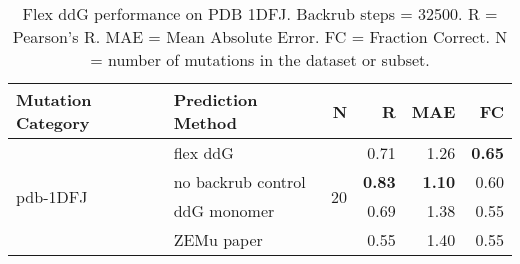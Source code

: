 \begin{table}
  \begin{tabular}{llrrrr}
\toprule
Mutation Category &   Prediction Method &   N &    R &  MAE &   FC \\
\midrule
 \multirow{ 4}{*}{pdb-1DFJ} & flex ddG & \multirow{ 4}{*}{20} & 0.71 & 1.26 & \textbf{0.65}  \\
 & no backrub control & & \textbf{0.83} & \textbf{1.10} & 0.60  \\
 & ddG monomer & & 0.69 & 1.38 & 0.55  \\
 & ZEMu paper & & 0.55 & 1.40 & 0.55  \\
\bottomrule
\end{tabular}
  \caption[Flex ddG performance on PDB 1DFJ]{
    Flex ddG performance on PDB 1DFJ. Backrub steps = 32500. R = Pearson's R. MAE = Mean Absolute Error. FC = Fraction Correct. N = number of mutations in the dataset or subset.
  } \label{tab:table-pdb-1DFJ}
\end{table}
